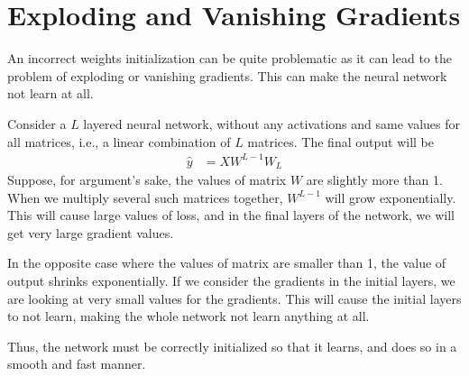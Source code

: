 \documentclass[../../deep_learning_notes.tex]{subfiles}
\begin{document}
\section{Exploding and Vanishing Gradients}
An incorrect weights initialization can be quite problematic as it can lead to the problem of exploding or vanishing gradients. This can make the neural network not learn at all.\newline

Consider a $L$ layered neural network, without any activations and same values for all matrices, i.e., a linear combination of $L$ matrices. The final output will be
\begin{align*}
    \hat{y} &= XW^{L-1}W_{L}
\end{align*}
Suppose, for argument's sake, the values of matrix $W$ are slightly more than 1. When we multiply several such matrices together, $W^{L-1}$ will grow exponentially. This will cause large values of loss, and in the final layers of the network, we will get very large gradient values.\newline

In the opposite case where the values of matrix are smaller than 1, the value of output shrinks exponentially. If we consider the gradients in the initial layers, we are looking at very small values for the gradients. This will cause the initial layers to not learn, making the whole network not learn anything at all.\newline

Thus, the network must be correctly initialized so that it learns, and does so in a smooth and fast manner.
\end{document}
